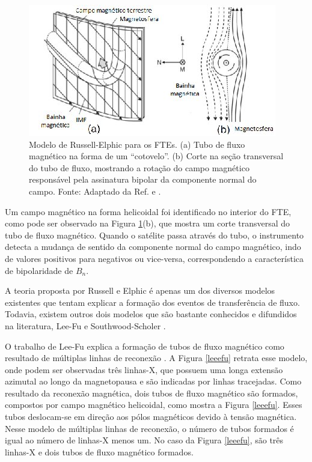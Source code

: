 \begin{figure}
	\begin{center}
		\includegraphics[scale=0.6]{russel.jpg}
		\caption{ Modelo de Russell-Elphic para os FTEs. (a) Tubo de fluxo magnético na forma de um ``cotovelo''. (b) Corte na seção transversal do tubo de fluxo, mostrando a rotação do campo magnético responsável pela assinatura bipolar da componente normal do campo. Fonte: Adaptado da Ref. \cite{elphic1978} e \cite{paschmann1982}. }
		\label{russel}
	\end{center}
\end{figure}


Um campo magnético na forma helicoidal foi identificado no interior do FTE, como pode ser observado na Figura \ref{russel}(b), que mostra um corte transversal do tubo de fluxo magnético. Quando o satélite passa através do tubo, o instrumento detecta a mudança de sentido da componente normal do campo magnético, indo de valores positivos para negativos ou vice-versa, correspondendo a característica de bipolaridade de \textbf{$B_n$}. 

A teoria proposta por Russell e Elphic \cite{elphic1978} é apenas um dos diversos modelos existentes que tentam explicar a formação dos eventos de transferência de fluxo. Todavia, existem outros dois modelos que são bastante conhecidos e difundidos na literatura, Lee-Fu \cite{lee1985} e Southwood-Scholer \cite{southwood1988,scholer1988}.

O trabalho de Lee-Fu explica a formação de tubos de fluxo magnético como resultado de múltiplas linhas de reconexão \cite{lee1985}. A Figura \ref{leeefu} retrata esse modelo, onde podem ser observadas três linhas-X, que possuem uma longa extensão azimutal ao longo da magnetopausa e são indicadas por linhas tracejadas. Como resultado da reconexão magnética, dois tubos de fluxo magnético são formados, compostos por campo magnético helicoidal, como mostra a Figura \ref{leeefu}. Esses tubos deslocam-se em direção aos pólos magnéticos devido à tensão magnética. Nesse modelo de múltiplas linhas de reconexão, o número de tubos formados é igual ao número de linhas-X menos um. No caso da Figura \ref{leeefu}, são três linhas-X e dois tubos de fluxo magnético formados. 

